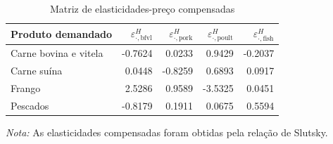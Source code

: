 
\begin{table}[H]
\centering
\caption{Matriz de elasticidades-preço compensadas}
\label{tab:elasticidades-compensadas}
\small
\begin{tabular}{@{}lrrrr@{}}
\toprule
Produto demandado & $\varepsilon^H_{\cdot,\text{bfvl}}$ & $\varepsilon^H_{\cdot,\text{pork}}$ & $\varepsilon^H_{\cdot,\text{poult}}$ & $\varepsilon^H_{\cdot,\text{fish}}$ \\
\midrule
Carne bovina e vitela & -0.7624 & 0.0233 & 0.9429 & -0.2037 \\
Carne suína & 0.0448 & -0.8259 & 0.6893 & 0.0917 \\
Frango & 2.5286 & 0.9589 & -3.5325 & 0.0451 \\
Pescados & -0.8179 & 0.1911 & 0.0675 & 0.5594 \\
\bottomrule
\end{tabular}
\par\vspace{0.35em}
\begin{minipage}{0.92\textwidth}\footnotesize \textit{Nota:} As elasticidades compensadas foram obtidas pela relação de Slutsky.\end{minipage}
\end{table}
